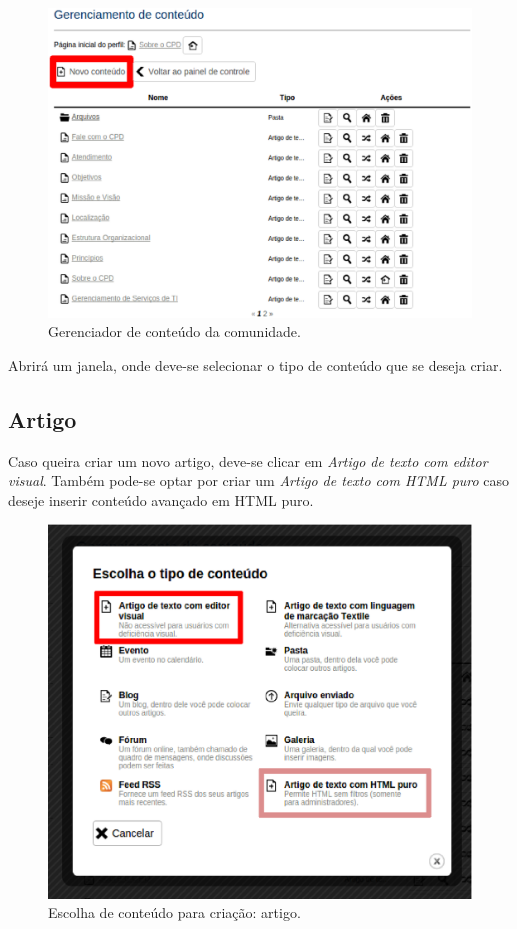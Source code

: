 \begin{figure}[H]
  \centering
    \includegraphics[keepaspectratio=true,scale=0.49]{figuras/novoConteudo.eps}
  \caption{Gerenciador de conteúdo da comunidade.}
  \label{fig:novoConteudo}
\end{figure}

Abrirá um janela, onde deve-se selecionar o tipo de conteúdo que se deseja criar. 

\subsection{Artigo}
\label{subsec:artigo}

Caso queira criar um novo artigo, deve-se clicar em \emph{\color{red}Artigo de texto com editor visual}. Também pode-se optar por criar um \emph{\color{pink}Artigo de texto com HTML puro} caso deseje inserir conteúdo avançado em HTML puro.

\begin{figure}[H]
  \centering
    \includegraphics[keepaspectratio=true,scale=0.49]{figuras/criandoArtigo.eps}
  \caption{Escolha de conteúdo para criação: artigo.}
  \label{fig:selecionarPasta}
\end{figure}

